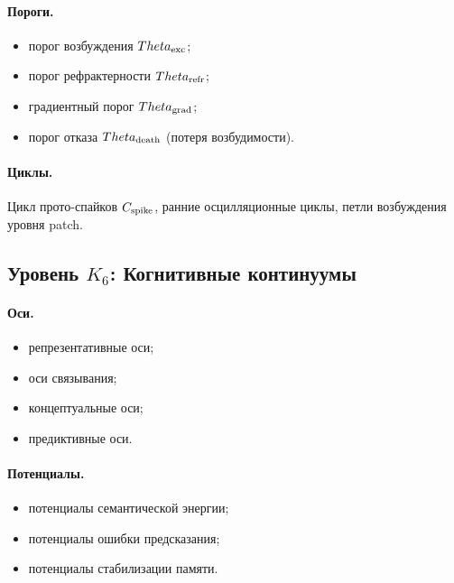 \paragraph{Пороги.}
\begin{itemize}
    \item порог возбуждения \(\Theta_{\rm exc}\);
    \item порог рефрактерности \(\Theta_{\rm refr}\);
    \item градиентный порог \(\Theta_{\rm grad}\);
    \item порог отказа \(\Theta_{\rm death}\) (потеря возбудимости).
\end{itemize}

\paragraph{Циклы.}
Цикл прото-спайков \(C_{\rm spike}\),
ранние осцилляционные циклы,
петли возбуждения уровня patch.


\subsection{Уровень \texorpdfstring{\texorpdfstring{$K_6$}{K\_6}}{K6}: Когнитивные континуумы}

\paragraph{Оси.}
\begin{itemize}
    \item репрезентативные оси;
    \item оси связывания;
    \item концептуальные оси;
    \item предиктивные оси.
\end{itemize}

\paragraph{Потенциалы.}
\begin{itemize}
    \item потенциалы семантической энергии;
    \item потенциалы ошибки предсказания;
    \item потенциалы стабилизации памяти.
\end{itemize}


